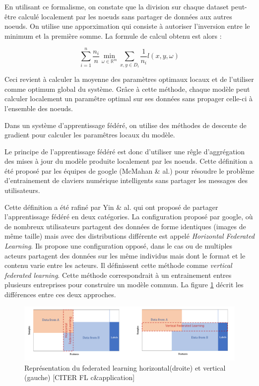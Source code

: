 \documentclass[stage3a]{tnreport} %
\begin{document}
En utilisant ce formalisme, on constate que la division sur chaque dataset peut-être calculé localement par les noeuds sans partager de données aux autres noeuds. On utilise une apporximation qui consiste à autoriser l'inversion entre le minimum et la première somme. La formule de calcul obtenu est alors :

\begin{equation}
  \sum_{i = 1}^n \frac{n_i}{n} \min_{\omega \in \mathbb{R}^m} \sum_{x,y \in D_i}\frac{1}{n_i}l(x,y,\omega) 
\end{equation}

Ceci revient à calculer la moyenne des paramètres optimaux locaux et de l'utiliser comme optimum global du système. Grâce à cette méthode, chaque modèle peut calculer localement un paramêtre optimal sur ses données sans propager celle-ci à l'ensemble des noeuds. 

Dans un système d'apprentissage fédéré, on utilise des méthodes de descente de gradient pour calculer les paramêtres locaux du modèle.

Le principe de l'apprentissage fédéré est donc d'utiliser une rêgle d'aggrégation des mises à jour du modèle produite localement par les noeuds. Cette définition a été proposé par les équipes de google (McMahan \& al.) pour résoudre le problème d'entrainement de claviers numérique intelligents sans partager les messages des utilisateurs.

Cette définition a été rafiné par Yin \& al. qui ont proposé de partager l'apprentissage fédéré en deux catégories. La configuration proposé par google, où de nombreux utilisateurs partagent des données de forme identiques (images de même taille) mais avec des distributions différente est appelé \textit{Horizontal Federated Learning}. Ils propose une configuration opposé, dans le cas ou de multiples acteurs partagent des données sur les même individus mais dont le format et le contenu varie entre les acteurs. Il définissent cette méthode comme  \textit{vertical federated learning}. Cette méthode correspondrait à un entrainement entres plusieurs entreprises pour construire un modèle commun. La figure \ref{fig:horizontal_vertical} décrit les différences entre ces deux approches.

\begin{figure}[]
  \centering
  \includegraphics[scale=1.65]{figures/horizontalvsvertical.png}
  \caption{Représentation du federated learning horizontal(droite) et vertical (gauche) [CITER FL c\&application]}
  \label{fig:horizontal_vertical}
\end{figure}
\end{document}
